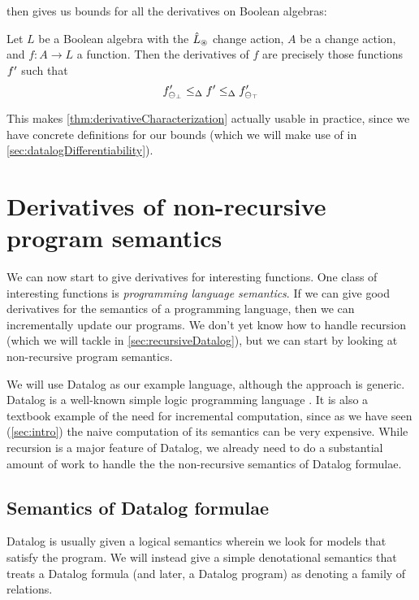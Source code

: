  then gives us bounds for
all the derivatives on Boolean algebras:

\begin{corollary}
\label{cor:booleanCharacterization}
  Let $L$ be a Boolean algebra with the $\hat{L}_\circledast$ change action, $A$ be
  a change action, and $f: A \rightarrow
  L$ a function. Then the derivatives of $f$ are precisely those functions
  $f'$ such that
  \begin{displaymath}
    f'_{\ominus_{\bot}}
    \leq_\Delta
    f'
    \leq_\Delta
    f'_{\ominus_{\top}}
  \end{displaymath}
\end{corollary}

This makes \cref{thm:derivativeCharacterization} actually usable in practice, since
we have concrete definitions for our bounds (which we will make use of in \cref{sec:datalogDifferentiability}).

\section{Derivatives of non-recursive program semantics}
\label{sec:nonRecursiveDatalog}

We can now start to give derivatives for interesting functions. One class of
interesting functions is \emph{programming language semantics}. If we can give
good derivatives for the semantics of a programming language, then we can
incrementally update our programs. We don't yet know how to handle recursion
(which we will tackle in \cref{sec:recursiveDatalog}), but we can start by
looking at non-recursive program semantics.

We will use Datalog as our example language, although the approach is generic.
Datalog is a well-known simple logic programming language \autocite[See][part D]{abiteboul1995foundations}.
It is also a textbook example of the need for incremental computation, since as we have seen
(\cref{sec:intro}) the naive computation of its semantics can be very expensive.
While recursion is a major feature of Datalog, we already need to do a substantial
amount of work to handle the the non-recursive semantics of Datalog formulae.

\subsection{Semantics of Datalog formulae}

Datalog is usually given a logical semantics wherein we look for models that
satisfy the program. We will instead give a simple denotational semantics that treats a Datalog
formula (and later, a Datalog program) as denoting a family of relations.


